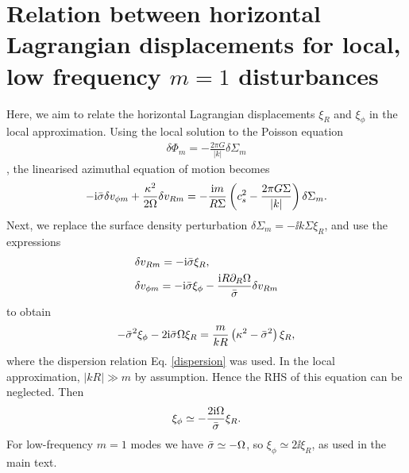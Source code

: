 \section{Relation between horizontal Lagrangian displacements for
  local, low frequency \lowercase{$m=1$} disturbances}\label{horizontal_displacements}
Here, we aim to relate the horizontal Lagrangian displacements $\xi_R$
and $\xi_\phi$ in the local approximation. Using the local solution to
the Poisson equation 
\begin{align}
  \delta \Phi_m = -\frac{2\pi G}{|k|} \delta\Sigma_m 
\end{align}
\citep{shu91}, the linearised azimuthal equation of motion becomes 
\begin{align} 
  - \mathrm{i}\bar{\sigma} \delta v_{\phi m}  + \frac{\kappa^2}{2\Omega}\delta v_{Rm} = -\frac{\mathrm{i}
    m}{R\Sigma}\left(c_s^2 - \frac{2\pi G
      \Sigma}{|k|}\right)\delta\Sigma_m. 
\end{align}
Next, we replace the surface density perturbation
$\delta \Sigma_m = -\ii k \Sigma \xi_R$, and use the expressions
\begin{align}
  &\delta v_{Rm} = -\mathrm{i}\bar{\sigma}\xi_R,\\
  &\delta v_{\phi m} = -\mathrm{i}\bar{\sigma}\xi_\phi - \frac{\mathrm{i} R
    \partial_R\Omega}{\bar{\sigma}} \delta v_{Rm}
\end{align}
\citep{papaloizou85} to obtain 
\begin{align}
  -\bar{\sigma}^2\xi_\phi - 2\mathrm{i}\bar{\sigma}\Omega \xi_R =
  \frac{m}{kR}\left(\kappa^2 - \bar{\sigma}^2\right)\xi_R, 
\end{align}
where the dispersion relation Eq. \ref{dispersion} was used. 
In the local approximation, $|kR|\gg m$ by assumption.%
 Hence the RHS of this equation can be neglected. Then 
\begin{align}
  \xi_\phi \simeq -\frac{2\mathrm{i}\Omega}{\bar{\sigma}}\xi_R.
\end{align}
For low-frequency $m=1$ modes we have $\bar{\sigma} \simeq -\Omega$, so
$\xi_\phi\simeq 2\ii\xi_R$, as used in the main text.  
